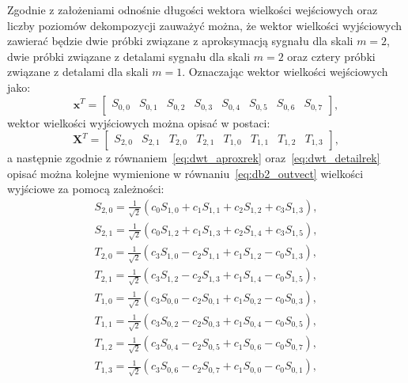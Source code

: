 Zgodnie z założeniami odnośnie długości wektora wielkości wejściowych oraz liczby poziomów dekompozycji zauważyć można, że wektor wielkości wyjściowych zawierać będzie dwie próbki związane z aproksymacją sygnału dla skali $m = 2$, dwie próbki związane z detalami sygnału dla skali $m = 2$ oraz cztery próbki związane z detalami dla skali $m = 1$. Oznaczając wektor wielkości wejściowych jako:
\begin{equation}
\mathbf{x}^{T} =
\begin{bmatrix}
S_{0,0} & S_{0,1} & S_{0,2} & S_{0,3} & S_{0,4} & S_{0,5} & S_{0,6} & S_{0,7}
\end{bmatrix}
\label{eq:db2_invect},
\end{equation}
wektor wielkości wyjściowych można opisać w postaci:
\begin{equation}
\mathbf{X}^{T} =
\begin{bmatrix}
S_{2,0} & S_{2,1} & T_{2,0} & T_{2,1} & T_{1,0} & T_{1,1} & T_{1,2} & T_{1,3}
\end{bmatrix}
\label{eq:db2_outvect},
\end{equation}
a następnie zgodnie z równaniem~\eqref{eq:dwt_aproxrek} oraz~\eqref{eq:dwt_detailrek} opisać można kolejne wymienione w równaniu~\eqref{eq:db2_outvect} wielkości wyjściowe za pomocą zależności:
\begin{gather}
S_{2,0} = \frac{1}{\sqrt{2}} \left( c_{0} S_{1,0} + c_{1} S_{1,1} + c_{2} S_{1,2} + c_{3} S_{1,3} \right) \label{eq:db2_outvect_s_2_0}, \\
S_{2,1} = \frac{1}{\sqrt{2}} \left( c_{0} S_{1,2} + c_{1} S_{1,3} + c_{2} S_{1,4} + c_{3} S_{1,5} \right) \label{eq:db2_outvect_s_2_1}, \\
T_{2,0} = \frac{1}{\sqrt{2}} \left( c_{3} S_{1,0} - c_{2} S_{1,1} + c_{1} S_{1,2} - c_{0} S_{1,3} \right) \label{eq:db2_outvect_t_2_0}, \\
T_{2,1} = \frac{1}{\sqrt{2}} \left( c_{3} S_{1,2} - c_{2} S_{1,3} + c_{1} S_{1,4} - c_{0} S_{1,5} \right) \label{eq:db2_outvect_t_2_1}, \\
T_{1,0} = \frac{1}{\sqrt{2}} \left( c_{3} S_{0,0} - c_{2} S_{0,1} + c_{1} S_{0,2} - c_{0} S_{0,3} \right) \label{eq:db2_outvect_t_1_0}, \\
T_{1,1} = \frac{1}{\sqrt{2}} \left( c_{3} S_{0,2} - c_{2} S_{0,3} + c_{1} S_{0,4} - c_{0} S_{0,5} \right) \label{eq:db2_outvect_t_1_1}, \\
T_{1,2} = \frac{1}{\sqrt{2}} \left( c_{3} S_{0,4} - c_{2} S_{0,5} + c_{1} S_{0,6} - c_{0} S_{0,7} \right) \label{eq:db2_outvect_t_1_2}, \\
T_{1,3} = \frac{1}{\sqrt{2}} \left( c_{3} S_{0,6} - c_{2} S_{0,7} + c_{1} S_{0,0} - c_{0} S_{0,1} \right) \label{eq:db2_outvect_t_1_3},
\end{gather}
